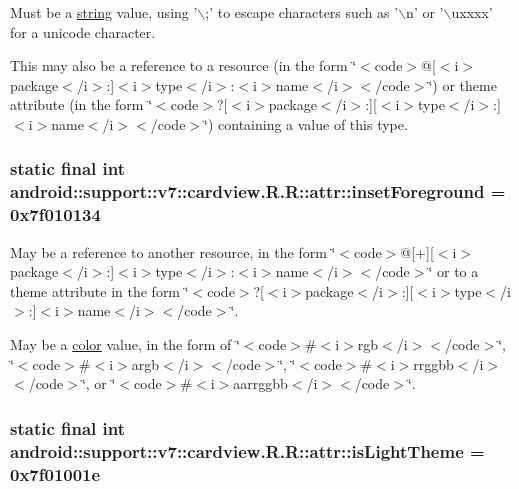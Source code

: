 Must be a \hyperlink{classandroid_1_1support_1_1v7_1_1cardview_1_1_r_1_1string}{string} value, using '$\backslash$;' to escape characters such as '$\backslash$n' or '$\backslash$uxxxx' for a unicode character. 

This may also be a reference to a resource (in the form \char`\"{}$<$code$>$@\mbox{[}$<$i$>$package$<$/i$>$:\mbox{]}$<$i$>$type$<$/i$>$:$<$i$>$name$<$/i$>$$<$/code$>$\char`\"{}) or theme attribute (in the form \char`\"{}$<$code$>$?\mbox{[}$<$i$>$package$<$/i$>$:\mbox{]}\mbox{[}$<$i$>$type$<$/i$>$:\mbox{]}$<$i$>$name$<$/i$>$$<$/code$>$\char`\"{}) containing a value of this type. \hypertarget{classandroid_1_1support_1_1v7_1_1cardview_1_1_r_1_1attr_1be2094d6a26f9c0d3287c7f61cf2493}{
\subsubsection[{insetForeground}]{\setlength{\rightskip}{0pt plus 5cm}static final int android::support::v7::cardview.R.R::attr::insetForeground = 0x7f010134}}
\label{classandroid_1_1support_1_1v7_1_1cardview_1_1_r_1_1attr_1be2094d6a26f9c0d3287c7f61cf2493}


May be a reference to another resource, in the form \char`\"{}$<$code$>$@\mbox{[}+\mbox{]}\mbox{[}$<$i$>$package$<$/i$>$:\mbox{]}$<$i$>$type$<$/i$>$:$<$i$>$name$<$/i$>$$<$/code$>$\char`\"{} or to a theme attribute in the form \char`\"{}$<$code$>$?\mbox{[}$<$i$>$package$<$/i$>$:\mbox{]}\mbox{[}$<$i$>$type$<$/i$>$:\mbox{]}$<$i$>$name$<$/i$>$$<$/code$>$\char`\"{}. 

May be a \hyperlink{classandroid_1_1support_1_1v7_1_1cardview_1_1_r_1_1color}{color} value, in the form of \char`\"{}$<$code$>$\#$<$i$>$rgb$<$/i$>$$<$/code$>$\char`\"{}, \char`\"{}$<$code$>$\#$<$i$>$argb$<$/i$>$$<$/code$>$\char`\"{}, \char`\"{}$<$code$>$\#$<$i$>$rrggbb$<$/i$>$$<$/code$>$\char`\"{}, or \char`\"{}$<$code$>$\#$<$i$>$aarrggbb$<$/i$>$$<$/code$>$\char`\"{}. \hypertarget{classandroid_1_1support_1_1v7_1_1cardview_1_1_r_1_1attr_21d182868570cf817d326710a36ec362}{
\subsubsection[{isLightTheme}]{\setlength{\rightskip}{0pt plus 5cm}static final int android::support::v7::cardview.R.R::attr::isLightTheme = 0x7f01001e}}
\label{classandroid_1_1support_1_1v7_1_1cardview_1_1_r_1_1attr_21d182868570cf817d326710a36ec362}


